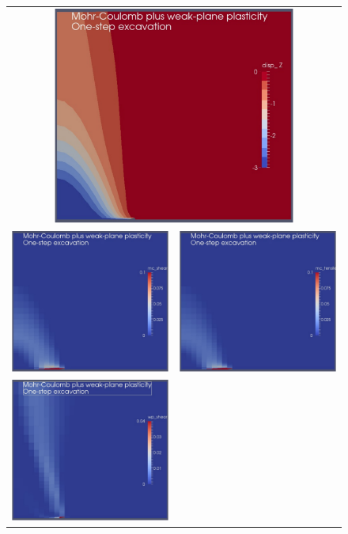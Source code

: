 \documentclass[]{scrreprt}
\begin{document}
\begin{figure}[p]
\begin{center}
\begin{tabular}{cc}
\multicolumn{2}{c}{\includegraphics[width=8cm]{mc_wp_one_step_disp.pdf}}
  \\
\includegraphics[width=6cm]{mc_wp_one_step_mc_shear.pdf} &
\includegraphics[width=6cm]{mc_wp_one_step_mc_tensile.pdf} \\
\includegraphics[width=6cm]{mc_wp_one_step_wp_shear.pdf} &

\end{tabular}
\end{center}
\end{figure}
\end{document}
